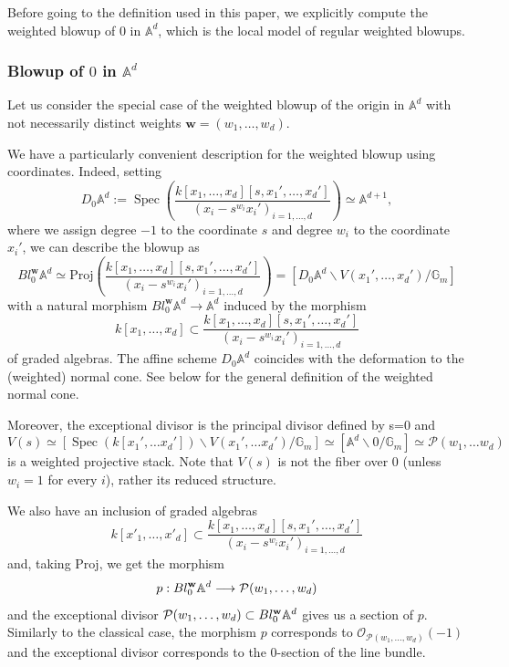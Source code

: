 \documentclass[12pt]{amsart}
\newcommand\spec{\operatorname{Spec}}
\newcommand\Gm{\mathbb{G}_m}
\newcommand\Proj{\text{Proj}}
\newcommand\A{\mathbb{A}}
\newcommand{\bA}{\mathbb{A}}
\newcommand{\sO}{\mathscr{O}}
\newcommand{\cP}{\mathcal{P}}
\theoremstyle{definition}
\begin{document}
Before going to the definition used in this paper, we explicitly compute the weighted blowup of $0$ in $\bA^d$, which is the local model of regular weighted blowups.

\subsubsection{Blowup of $0$ in $\mathbb{A}^d$}\label{sub:blowup-0-An}

Let us consider the special case of the weighted blowup of the origin in $\A^d$ with not necessarily distinct weights $\mathbf{w}=(w_1,\dots,w_d)$.

We have a particularly convenient description for the weighted blowup using coordinates. Indeed, setting
$$D_0\bA^d:= \spec\left(\frac{k[x_1,\dots,x_d][s,x_1',\dots,x_d']}{(x_i-s^{w_i}x_i')_{i=1,\dots, d}}\right) \simeq \bA^{d+1},$$
where we assign degree $-1$ to the coordinate $s$ and degree $w_i$ to the coordinate $x_i'$, we can describe the blowup as 
$$Bl_0^\mathbf{w}\bA^d\simeq \Proj\left(\frac{k[x_1,\dots,x_d][s,x_1',\dots,x_d']}{(x_i-s^{w_i}x_i')_{i=1,\dots,d}}\right)=[D_0\bA^d\smallsetminus V(x_1',\dots,x_d')/\Gm]$$
with a natural morphism $Bl_0^\mathbf{w}\bA^d \rightarrow \mathbb{A}^d$ induced by the morphism 
$$
k[x_1,\dots,x_d] \subset \frac{k[x_1,\dots,x_d][s,x_1',\dots,x_d']}{(x_i-s^{w_i}x_i')_{i=1,\dots,d}}
$$ 
of graded algebras. The affine scheme $D_0\bA^d$ coincides with the deformation to the (weighted) normal cone. See below for the general definition of the weighted normal cone. 

Moreover, the exceptional divisor is the principal divisor defined by s=0 and $$V(s)\simeq [\spec(k[x_1',\dots x_d'])\smallsetminus V(x_1',\dots x_d')/\Gm ]\simeq [\bA^d\smallsetminus 0/\Gm] \simeq \cP( w_1, \dots w_d)$$ is a  weighted projective stack. Note that $V(s)$ is not the fiber over $0$ (unless $w_i=1$ for every $i$), rather its reduced structure.

We also have an inclusion of graded algebras
$$ k[x'_1,\dots,x'_d] \subset  \frac{k[x_1,\dots,x_d][s,x_1',\dots,x_d']}{(x_i-s^{w_i}x_i')_{i=1,\dots,d}} $$
and, taking $\Proj$, we get the morphism
$$p:Bl_0^{\bold{w}} \A^d \longrightarrow \cP(w_1,\dots,w_d)$$ and the exceptional divisor $\cP(w_1,\dots,w_d) \subset Bl_0^{\bold{w}} \A^d$ gives us a section of $p$. Similarly to the classical case, the morphism $p$ corresponds to $\sO_{\cP(w_1,\dots,w_d)}(-1)$ and the exceptional divisor corresponds to the $0$-section of the line bundle.
\end{document}
